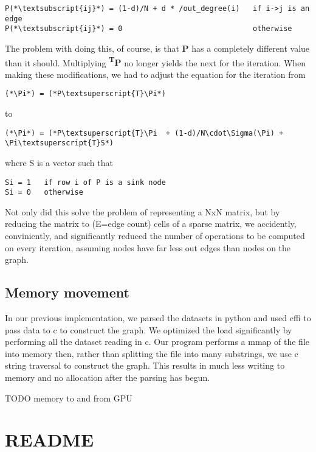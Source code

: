 \documentclass{report}
\begin{document}
\begin{lstlisting}
P(*\textsubscript{ij}*) = (1-d)/N + d * /out_degree(i)   if i->j is an edge
P(*\textsubscript{ij}*) = 0                              otherwise
\end{lstlisting}

The problem with doing this, of course, is that \textbf{P} has a completely different value than it should. Multiplying \textbf{\Pi\textsuperscript{T}P} no longer yields the next \Pi  for the iteration. When making these modifications, we had to adjust the equation for the iteration from

\begin{lstlisting}
(*\Pi*) = (*P\textsuperscript{T}\Pi*)
\end{lstlisting}

to

\begin{lstlisting}
(*\Pi*) = (*P\textsuperscript{T}\Pi  + (1-d)/N\cdot\Sigma(\Pi) + \Pi\textsuperscript{T}S*)
\end{lstlisting}

where S is a vector such that

\begin{lstlisting}
Si = 1   if row i of P is a sink node
Si = 0   otherwise
\end{lstlisting}

Not only did this solve the problem of representing a NxN matrix, but by reducing the matrix to (E=edge count) cells of a sparse matrix, we accidently, conviniently, and significantly reduced the number of operations to be computed on every iteration, assuming nodes have far less out edges than nodes on the graph.

\subsection{Memory movement}
In our previous implementation, we parsed the datasets in python and used cffi to pass data to c to construct the graph. We optimized the load significantly by performing all the dataset reading in c. Our program performs a mmap of the file into memory then, rather than splitting the file into many substrings, we use c string traversal to construct the graph. This results in much less writing to memory and no allocation after the parsing has begun.

TODO memory to and from GPU

\appendix

\section{README}
\end{document}
